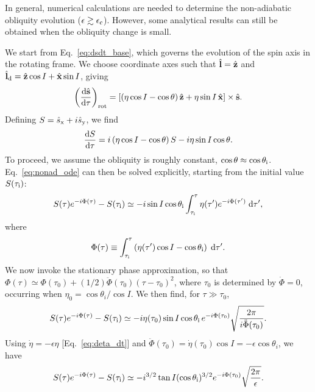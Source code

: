 In general, numerical calculations are needed to determine the non-adiabatic
obliquity evolution ($\epsilon\gtrsim \epsilon_{\rm c}$). However, some
analytical results can still be obtained when the obliquity change is small.

We start from Eq.~\eqref{eq:dsdt_base}, which governs the evolution of the spin
axis in the rotating frame. We choose coordinate axes such that $\hat{\boldsymbol{\mathbf{l}}} =
\hat{\boldsymbol{\mathbf{z}}}$ and $ \hat{\boldsymbol{\mathbf{l}}}_{\rm d} = \hat{\boldsymbol{\mathbf{z}}} \cos I + \hat{\boldsymbol{\mathbf{x}}}\sin I$, giving
\begin{equation}
    \p{\rd{\uv{s}}{\tau}}_{\rm rot} = \s{
        \p{\eta \cos I - \cos \theta}\uv{z}
            + \eta \sin I \,\uv{x}} \times \uv{s}.
\end{equation}
Defining $S = {\hat s}_{\rm x} + i{\hat s}_{\rm y}$, we find
\begin{equation}
    \rd{S}{\tau} = i\p{\eta\cos I - \cos \theta}S
        - i \eta \sin I\cos\theta.\label{eq:nonad_ode}
\end{equation}
To proceed, we assume the obliquity is roughly constant, $\cos \theta \approx
\cos \theta_{\rm i}$. Eq.~\eqref{eq:nonad_ode} can then be solved explicitly,
starting from the initial value $S(\tau_{\rm i})$:
\begin{equation}
    S(\tau)e^{-i\Phi(\tau)} - S(\tau_{\rm i})
        \simeq -i\sin I \cos \theta_{\rm i}
            \int_{\tau_{\rm i}}^\tau \eta(\tau')
            e^{-i\Phi(\tau')}\;\mathrm{d}\tau',
\end{equation}
where
\begin{equation}
    \Phi(\tau) \equiv \int_{\tau_{\rm i}}^\tau \p{\eta(\tau') \cos I
        - \cos \theta_{\rm i}}\; \mathrm{d}\tau'.
\end{equation}
We now invoke the stationary phase approximation, so that $\Phi(\tau)\simeq
\Phi(\tau_0) + (1/2)\ddot\Phi (\tau_0)(\tau - \tau_0)^2$, where $\tau_0$ is
determined by $\dot\Phi = 0$, occurring when $\eta_0 = \cos \theta_i /\cos I$.
We then find, for $\tau \gg \tau_0$,
\begin{equation}
    S(\tau)e^{-i\Phi(\tau)} - S(\tau_{\rm i})
        \simeq -i \eta(\tau_0)\sin I \cos \theta_{\rm i}\,e^{-i\Phi(\tau_0)}
            \sqrt{\frac{2\pi}{i \ddot\Phi(\tau_0)}}.
\end{equation}
Using $\dot\eta = -\epsilon \eta$ [Eq.~\eqref{eq:deta_dt}] and
$\ddot\Phi(\tau_0) = \dot\eta(\tau_0)\cos I = -\epsilon \cos\theta_i$,
we have
\begin{equation}
  S(\tau)e^{-i\Phi(\tau)} - S(\tau_{\rm i})
        \simeq -i^{3/2}\tan I (\cos\theta_{\rm i})^{3/2} e^{-i\Phi(\tau_0)}
            \sqrt{\frac{2\pi}{\epsilon}}.
\end{equation}
